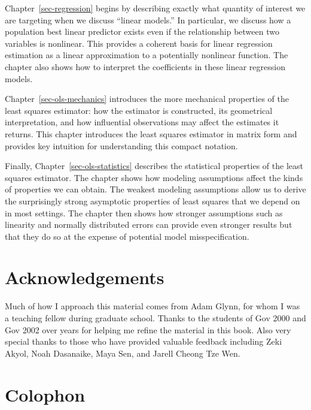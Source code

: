 \documentclass[
  13pt,
  letterpaper,
  DIV=11,
  numbers=noendperiod]{scrreprt}
\theoremstyle{plain}
\theoremstyle{definition}
\theoremstyle{definition}
\theoremstyle{remark}
\begin{document}
Chapter~\ref{sec-regression} begins by describing exactly what quantity
of interest we are targeting when we discuss ``linear models.'' In
particular, we discuss how a population best linear predictor exists
even if the relationship between two variables is nonlinear. This
provides a coherent basis for linear regression estimation as a linear
approximation to a potentially nonlinear function. The chapter also
shows how to interpret the coefficients in these linear regression
models.

Chapter~\ref{sec-ols-mechanics} introduces the more mechanical
properties of the least squares estimator: how the estimator is
constructed, its geometrical interpretation, and how influential
observations may affect the estimates it returns. This chapter
introduces the least squares estimator in matrix form and provides key
intuition for understanding this compact notation.

Finally, Chapter~\ref{sec-ols-statistics} describes the statistical
properties of the least squares estimator. The chapter shows how
modeling assumptions affect the kinds of properties we can obtain. The
weakest modeling assumptions allow us to derive the surprisingly strong
asymptotic properties of least squares that we depend on in most
settings. The chapter then shows how stronger assumptions such as
linearity and normally distributed errors can provide even stronger
results but that they do so at the expense of potential model
misspecification.

\section*{Acknowledgements}\label{acknowledgements}


Much of how I approach this material comes from Adam Glynn, for whom I
was a teaching fellow during graduate school. Thanks to the students of
Gov 2000 and Gov 2002 over years for helping me refine the material in
this book. Also very special thanks to those who have provided valuable
feedback including Zeki Akyol, Noah Dasanaike, Maya Sen, and Jarell
Cheong Tze Wen.

\section*{Colophon}\label{colophon}
\end{document}

